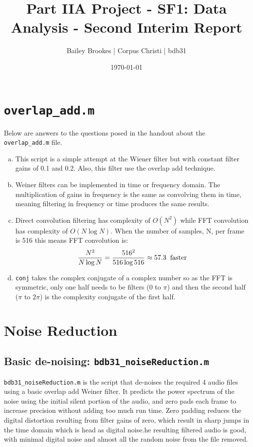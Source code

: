 \documentclass[11pt]{article}
\title{Part IIA Project - SF1: Data Analysis - Second Interim Report}
\author{Bailey Brookes | Corpus Christi | bdb31}
\date{\today}
\begin{document}
\maketitle

\section{\texttt{overlap\_add.m}}
Below are answers to the questions posed in the handout about the \texttt{overlap\_add.m} file.
\begin{enumerate}[(a)]
	\item This script is a simple attempt at the Wiener filter but with constant filter gains of 0.1 and 0.2. Also, this filter use the overlap add technique. 
	\item Weiner filters can be implemented in time or frequency domain. The multiplication of gains in frequency is the same as convolving them in time, meaning filtering in frequency or time produces the same results.
	\item Direct convolution filtering has complexity of $O(N^2)$ while FFT convolution has complexity of $O(N\log N)$. When the number of samples, N, per frame is 516 this means FFT convolution is:
		\[
	\frac{N^2}{N\log N} = \frac{516^2}{516\log 516} \approx 57.3 \hspace{0.2cm}\text{faster}
	\]
	\item \texttt{conj} takes the complex conjugate of a complex number so as the FFT is symmetric, only one half needs to be filters (0 to $\pi$) and then the second half ($\pi$ to $2\pi$) is the complexity conjugate of the first half.
\end{enumerate}

\section{Noise Reduction}
\subsection{Basic de-noising: \texttt{bdb31\_noiseReduction.m}}
\texttt{bdb31\_noiseReduction.m} is the script that de-noises the required 4 audio files using a basic overlap add Weiner filter. It predicts the power spectrum of the noise using the initial silent portion of the audio, and zero pads each frame to increase precision without adding too much run time. Zero padding reduces the digital distortion resulting from filter gains of zero, which result in sharp jumps in the time domain which is head as digital noise.he resulting filtered audio is good, with minimal digital noise and almost all the random noise from the file removed. 
\end{document}
